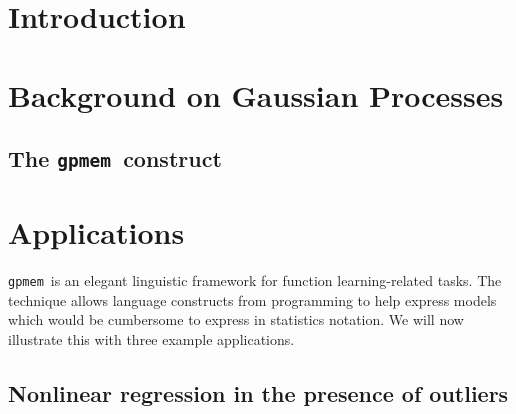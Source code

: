 \documentclass[twoside,11pt]{article}
\newcommand{\gpmem}{\texttt{gpmem}}
\newcommand{\myparagraph}[1]{\paragraph{#1}\mbox{}\\}
\begin{document}
\section{Introduction}

%
%

%

\section{Background on Gaussian Processes}


%

\subsection{The \gpmem\ construct}


%



\section{Applications}
\gpmem\ is an elegant linguistic framework for function learning-related tasks.
The technique allows language constructs from programming to help express models
which would be cumbersome to express in statistics notation.
We will now illustrate this with three example applications. 

\subsection{Nonlinear regression in the presence of outliers}

%
\end{document}
